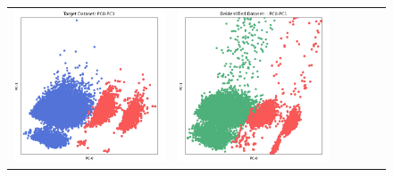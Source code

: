 \begin{figure}[p!]
\begin{tabular}{@{} M{0.166\textwidth} M{0.166\textwidth} | M{0.166\textwidth} M{0.166\textwidth} | M{0.166\textwidth} M{0.166\textwidth} @{}}
       \includegraphics[width=\linewidth]{z_mwem-pgm.orig.png} &
       \includegraphics[width=\linewidth]{z_mwem-pgm.syn.png} \\ 

\end{tabular}
\end{figure}
